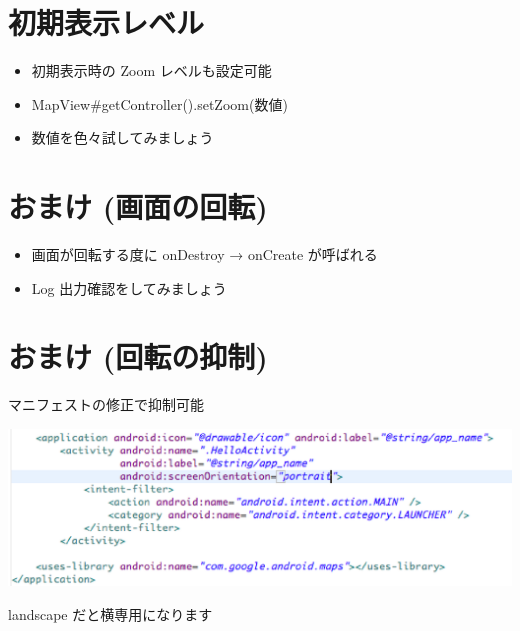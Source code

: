 \documentclass[slide,papersize]{jsarticle}
\begin{document}
\section*{初期表示レベル}
\bigskip
\begin{itemize}
\item 初期表示時の Zoom レベルも設定可能
\bigskip
\item MapView\#getController().setZoom(数値)
\bigskip
\item 数値を色々試してみましょう
\end{itemize}

\section*{おまけ (画面の回転)}
\bigskip
\begin{itemize}
\item 画面が回転する度に onDestroy → onCreate が呼ばれる
\bigskip
\item Log 出力確認をしてみましょう
\end{itemize}

\section*{おまけ (回転の抑制)}
\medskip
マニフェストの修正で抑制可能
\begin{center}
\includegraphics[scale=0.3]{portrait.eps}
\end{center}
landscape だと横専用になります
\end{document}
